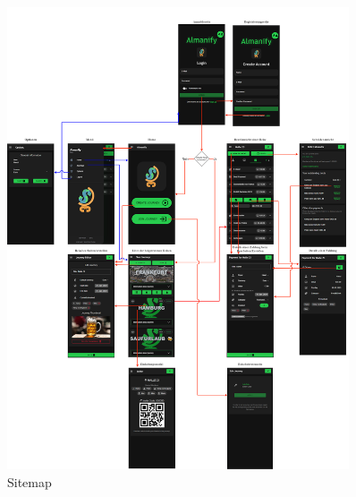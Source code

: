 \begin{figure}[H]
	\centering
	\includegraphics[width=0.9\textwidth]{img/Sitemap}
	\caption[Sitemap]{Sitemap}
	\label{fig:Sitemap}
\end{figure}